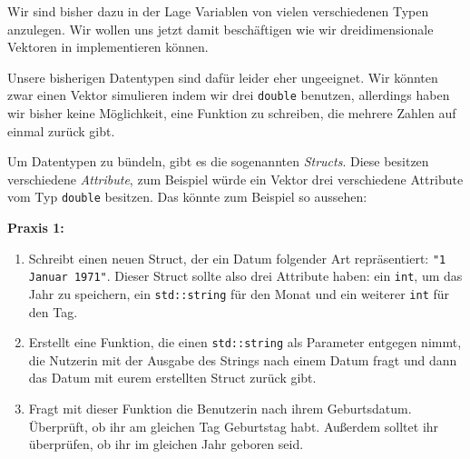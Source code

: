 
Wir sind bisher dazu in der Lage Variablen von vielen verschiedenen Typen anzulegen.
Wir wollen uns jetzt damit beschäftigen wie wir dreidimensionale Vektoren in \Cpp implementieren können.

Unsere bisherigen Datentypen sind dafür leider eher ungeeignet.
Wir könnten zwar einen Vektor simulieren indem wir drei \texttt{double} benutzen, allerdings haben wir bisher keine Möglichkeit, eine Funktion zu schreiben, die mehrere Zahlen auf einmal zurück gibt.

Um Datentypen zu bündeln, gibt es die sogenannten \emph{Structs}.
Diese besitzen verschiedene \emph{Attribute}, zum Beispiel würde ein Vektor drei verschiedene Attribute vom Typ \texttt{double} besitzen.
Das könnte zum Beispiel so aussehen:


%

\textbf{Praxis 1:}
\begin{enumerate}
    \item Schreibt einen neuen Struct, der ein Datum folgender Art repräsentiert: \texttt{"1 Januar 1971"}.
        Dieser Struct sollte also drei Attribute haben:
        ein \texttt{int}, um das Jahr zu speichern,
        ein \texttt{std::string} für den Monat
        und ein weiterer \texttt{int} für den Tag.

    \item Erstellt eine Funktion, die einen \texttt{std::string} als Parameter entgegen nimmt, die Nutzerin mit der Ausgabe des Strings nach einem Datum fragt und dann das Datum mit eurem erstellten Struct zurück gibt.

    \item Fragt mit dieser Funktion die Benutzerin nach ihrem Geburtsdatum. Überprüft, ob ihr am gleichen Tag Geburtstag habt.
Außerdem solltet ihr überprüfen, ob ihr im gleichen Jahr geboren seid.
\end{enumerate}

